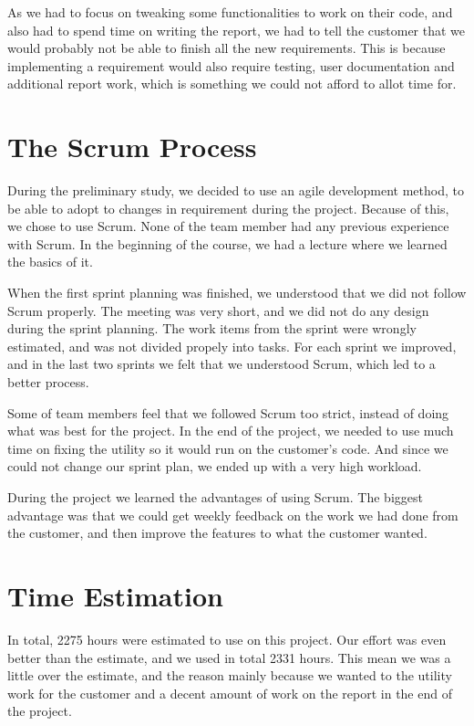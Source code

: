 As we had to focus on tweaking some functionalities to work on their code, and also had to spend time on writing the report, we had to tell the customer that we would probably not be able to finish all the new requirements. This is because implementing a requirement would also require testing, user documentation and additional report work, which is something we could not afford to allot time for.

\section{The Scrum Process}
During the preliminary study, we decided to use an agile development method,
to be able to adopt to changes in requirement during the project.
Because of this, we chose to use Scrum. None of the team member had any previous experience with 
Scrum. In the beginning of the course, we had a lecture where we learned the basics of it.

When the first sprint planning was finished, we understood that we did not 
follow Scrum properly. The meeting was very short, and we did not do any 
design during the sprint planning. The work items from the sprint were wrongly
estimated, and was not divided propely into tasks. For each sprint we 
improved, and in the last two sprints we felt that we understood Scrum,
which led to a better process.

Some of team members feel that we followed Scrum too strict, instead of doing 
what was best for the project. In the end of the project, we needed to use 
much time on fixing the utility so it would run on the customer's code. And since we 
could not change our sprint plan, we ended up with a very high workload.

During the project we learned the advantages of using Scrum. The biggest advantage was that we could 
get weekly feedback on the work we had done from the customer, and then improve the features 
to what the customer wanted.

\section{Time Estimation}
In total, 2275 hours were estimated to use on this project. Our effort was
even better than the estimate, and we used in total 2331 hours. This mean we 
was a little over the estimate, and the reason mainly because we wanted to the 
utility work for the customer and a decent amount of work on the report in the 
end of the project. 

